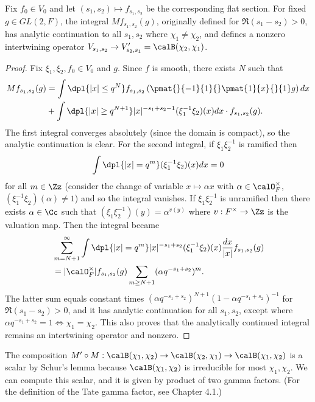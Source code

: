 \begin{proposition}
Fix $f_{0}\in V_{0}$ and let $(s_{1}, s_{2})\mapsto f_{s_{1}, s_{2}}$ be the corresponding flat section. 
For fixed $g\in GL(2, F)$, the integral $Mf_{s_{1}, s_{2}}(g)$, originally defined for $\Re(s_{1} - s_{2})>0$, has analytic continuation to all $s_{1}, s_{2}$ where $\chi_1 \neq\chi_2$, and defines a nonzero intertwining operator $V_{s_{1}, s_{2}}\to V_{s_{2}, s_{1}}' = \calB(\chi_2, \chi_1)$. 
\end{proposition}
\begin{proof}
Fix $\xi_1, \xi_2, f_{0}\in V_{0}$ and $g$. Since $f$ is smooth, there exists $N$ such that 
\begin{align*}
Mf_{s_{1}, s_{2}}(g) &= \int\dpl{|x|\leq q^{N}} f_{s_{1}, s_{2}}\left( \pmat{}{-1}{1}{} \pmat{1}{x}{}{1} g\right) dx \\
&+ \int\dpl{|x|\geq q^{N+1}} |x|^{-s_{1} + s_{2} -1} (\xi_{1}^{-1}\xi_{2})(x) dx \cdot f_{s_{1},s_{2}}(g). 
\end{align*}
The first integral converges absolutely (since the domain is compact), so the analytic continuation is clear. 
For the second integral, if $\xi_{1}\xi_{2}^{-1}$ is ramified then 
$$
\int\dpl{|x| = q^{m}} (\xi_{1}^{-1}\xi_{2})(x)dx = 0
$$ 
for all $m\in \Zz$ (consider the change of variable $x\mapsto \alpha x$ with $\alpha\in \calO_{F}^{\times}$, $(\xi_{1}^{-1}\xi_{2})(\alpha)\neq 1$) and so the integral vanishes. 
If $\xi_{1}\xi_{2}^{-1}$ is unramified then there exists $\alpha\in \Cc$ such that $(\xi_{1}\xi_{2}^{-1})(y) = \alpha^{v(y)}$ where $v:F^{\times} \to \Zz$ is the valuation map. 
Then the integral became
\begin{align*}
&\sum_{m = N+1}^{\infty}\int\dpl{|x|= q^{m}} |x|^{-s_{1} + s_{2}} (\xi_{1}^{-1}\xi_{2})(x) \frac{dx}{|x|} f_{s_{1}, s_{2}}(g) \\
&= |\calO_{F}^{\times}| f_{s_{1}, s_{2}}(g) \sum_{m \geq N+1} (\alpha q^{-s_{1} + s_{2}})^{m}. 
\end{align*}
The latter sum equals constant times $(\alpha q^{-s_{1} + s_{2}})^{N+1} (1-\alpha q^{-s_{1}+s_{2}})^{-1}$ for $\Re(s_{1} - s_{2}) >0$, and it has analytic continuation for all $s_{1}, s_{2}$, except where $\alpha q^{-s_{1} +s_{2}} = 1 \Leftrightarrow \chi_{1} = \chi_{2}$. 
This also proves that the analytically continued integral remains an intertwining operator and nonzero. 
\end{proof}

The composition $M'\circ M : \calB(\chi_1, \chi_2)\to \calB(\chi_2, \chi_1)\to \calB(\chi_1, \chi_2)$ is a scalar by Schur's lemma because $\calB(\chi_1, \chi_2)$ is irreducible for most $\chi_1, \chi_2$. 
We can compute this scalar, and it is given by product of two gamma factors. (For the definition of the Tate gamma factor, see Chapter 4.1.)

